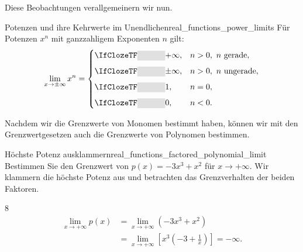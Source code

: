 Diese Beobachtungen verallgemeinern wir nun.
\begin{KeyPointBox}{Potenzen und ihre Kehrwerte im Unendlichen}{real_functions_power_limits}
  Für Potenzen $x^n$ mit ganzzahligem Exponenten $n$ gilt:
  \[
    \lim_{x\to\pm\infty}x^n=
    \begin{cases}
      \Cloze{1.2cm}{+\infty},&n>0,\ n\text{ gerade},\\[0.5em]
      \Cloze{1.2cm}{\pm\infty},&n>0,\ n\text{ ungerade},\\[0.5em]
      \Cloze{1.2cm}{1},&n=0,\\[0.5em]
      \Cloze{1.2cm}{0},&n<0.
    \end{cases}
  \]
\end{KeyPointBox}
Nachdem wir die Grenzwerte von Monomen bestimmt haben, können wir mit den
Grenzwertgesetzen auch die Grenzwerte von Polynomen bestimmen.
\begin{ExampleBox}{Höchste Potenz ausklammern}{real_functions_factored_polynomial_limit}
  Bestimmen Sie den Grenzwert von $p(x)=-3x^3+x^2$ für $x\to+\infty$.
  Wir klammern die höchste Potenz aus und betrachten das Grenzverhalten
  der beiden Faktoren.
  \begin{ClozeArea}[34]{8}
    \[
      \begin{aligned}
        \lim_{x\to+\infty}p(x)
          &=\lim_{x\to+\infty}\left(-3x^3+x^2\right)\\[1em]
          &=\lim_{x\to+\infty}\left[x^3\left(-3+\frac1x\right)\right] = -\infty.
      \end{aligned}
    \]
  \end{ClozeArea}
\end{ExampleBox}

